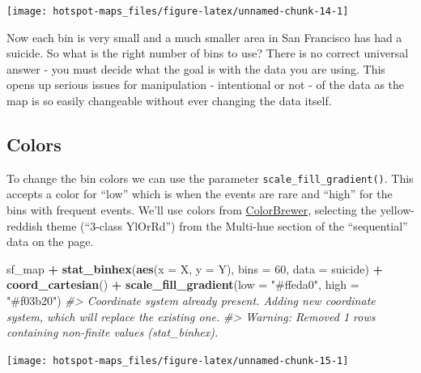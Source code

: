\documentclass[
  12pt,
]{book}
\newenvironment{Shaded}{\begin{snugshade}}{\end{snugshade}}
\newcommand{\CommentTok}[1]{\textcolor[rgb]{0.56,0.35,0.01}{\textit{#1}}}
\newcommand{\DataTypeTok}[1]{\textcolor[rgb]{0.13,0.29,0.53}{#1}}
\newcommand{\DecValTok}[1]{\textcolor[rgb]{0.00,0.00,0.81}{#1}}
\newcommand{\KeywordTok}[1]{\textcolor[rgb]{0.13,0.29,0.53}{\textbf{#1}}}
\newcommand{\NormalTok}[1]{#1}
\newcommand{\OperatorTok}[1]{\textcolor[rgb]{0.81,0.36,0.00}{\textbf{#1}}}
\newcommand{\StringTok}[1]{\textcolor[rgb]{0.31,0.60,0.02}{#1}}
\begin{document}
\begin{center}\texttt{[image: hotspot-maps\_files/figure-latex/unnamed-chunk-14-1]} \end{center}

Now each bin is very small and a much smaller area in San Francisco has had a suicide. So what is the right number of bins to use? There is no correct universal answer - you must decide what the goal is with the data you are using. This opens up serious issues for manipulation - intentional or not - of the data as the map is so easily changeable without ever changing the data itself.

\hypertarget{colors}{%
\subsection{Colors}\label{colors}}

To change the bin colors we can use the parameter \texttt{scale\_fill\_gradient()}. This accepts a color for ``low'' which is when the events are rare and ``high'' for the bins with frequent events. We'll use colors from \href{http://colorbrewer2.org}{ColorBrewer}, selecting the yellow-reddish theme (``3-class YlOrRd'') from the Multi-hue section of the ``sequential'' data on the page.

\begin{Shaded}
\begin{Highlighting}[]
\NormalTok{sf\_map }\OperatorTok{+}
\StringTok{  }\KeywordTok{stat\_binhex}\NormalTok{(}\KeywordTok{aes}\NormalTok{(}\DataTypeTok{x =}\NormalTok{ X, }\DataTypeTok{y =}\NormalTok{ Y),}
              \DataTypeTok{bins  =} \DecValTok{60}\NormalTok{,}
              \DataTypeTok{data =}\NormalTok{ suicide) }\OperatorTok{+}
\StringTok{  }\KeywordTok{coord\_cartesian}\NormalTok{() }\OperatorTok{+}
\StringTok{  }\KeywordTok{scale\_fill\_gradient}\NormalTok{(}\DataTypeTok{low =} \StringTok{"\#ffeda0"}\NormalTok{,}
                      \DataTypeTok{high =} \StringTok{"\#f03b20"}\NormalTok{)}
\CommentTok{\#> Coordinate system already present. Adding new coordinate system, which will replace the existing one.}
\CommentTok{\#> Warning: Removed 1 rows containing non{-}finite values (stat\_binhex).}
\end{Highlighting}
\end{Shaded}

\begin{center}\texttt{[image: hotspot-maps\_files/figure-latex/unnamed-chunk-15-1]} \end{center}
\end{document}
